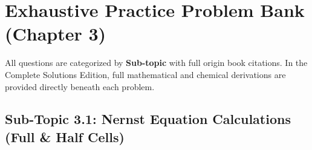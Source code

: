 \newpage
\section{Exhaustive Practice Problem Bank (Chapter 3)}
\label{sec:ch03_problem_bank}

\begin{tcolorbox}[enhanced,colback=subtlegreen,colframe=cengagegreen,arc=2mm,boxrule=1pt,title=\textbf{\large Organization of Practice Problems}]
All questions are categorized by \textbf{Sub-topic} with full origin book citations. In the Complete Solutions Edition, full mathematical and chemical derivations are provided directly beneath each problem.
\end{tcolorbox}

\subsection{Sub-Topic 3.1: Nernst Equation Calculations (Full \& Half Cells)}

